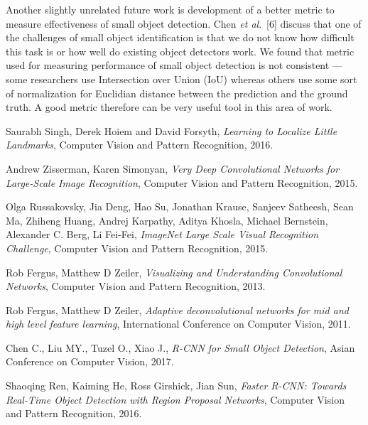 \documentclass [11pt,letterpaper ,twoside ,openany ]{report}
\begin{document}
    Another slightly unrelated future work is development of a better metric to measure effectiveness of small object detection. Chen \textit {et al}.\ [6] discuss that one of the challenges of small object identification is that we do not know how difficult this task is or how well do existing object detectors work. We found that metric used for measuring performance of small object detection is not consistent --- some researchers use Intersection over Union (IoU) whereas others use some sort of normalization for Euclidian distance between the prediction and the ground truth. A good metric therefore can be very useful tool in this area of work.

    \begin{thebibliography}{9}
          Saurabh Singh, Derek Hoiem and David Forsyth,
          \textit{Learning to Localize Little Landmarks},
          Computer Vision and Pattern Recognition,
          2016.          

          Andrew Zisserman, Karen Simonyan,
          \textit{Very Deep Convolutional Networks for Large-Scale Image Recognition},
          Computer Vision and Pattern Recognition,
          2015.                    

          Olga Russakovsky, Jia Deng, Hao Su, Jonathan Krause, Sanjeev Satheesh, Sean Ma, Zhiheng Huang, Andrej Karpathy, Aditya Khosla, Michael Bernstein, Alexander C. Berg, Li Fei-Fei,
          \textit{ImageNet Large Scale Visual Recognition Challenge},
          Computer Vision and Pattern Recognition,
          2015.                    

          Rob Fergus, Matthew D Zeiler,
          \textit{Visualizing and Understanding Convolutional Networks},
          Computer Vision and Pattern Recognition,
          2013.                              

          Rob Fergus, Matthew D Zeiler,
          \textit{Adaptive deconvolutional networks for mid and high level feature learning},
          International Conference on Computer Vision,
          2011.

          Chen C., Liu MY., Tuzel O., Xiao J.,
          \textit{R-CNN for Small Object Detection},
          Asian Conference on Computer Vision,
          2017.          

          Shaoqing Ren, Kaiming He, Ross Girshick, Jian Sun,
          \textit{Faster R-CNN: Towards Real-Time Object Detection with Region Proposal Networks},
          Computer Vision and Pattern Recognition,
          2016.                    


\end{thebibliography}
\end{document}
